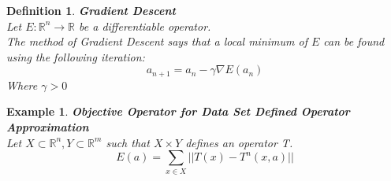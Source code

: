 \documentclass[12pt]{extarticle}
\theoremstyle{plain}
\theoremstyle{Definition}
\newtheorem{def.}{Definition}[section]
\theoremstyle{Definition}
\theoremstyle{plain}
\newtheorem{exmp}{Example}[section]
\begin{document}
\begin{def.} \textbf{Gradient Descent} \\ 
Let $E : \mathbb{R}^n \to \mathbb{R}$ be a differentiable operator. \\ 
The method of Gradient Descent says that a local minimum of $E$ can be found using the following iteration: \\ 
$$a_{n+1} = a_n - \gamma \nabla E(a_n)$$
Where $\gamma > 0$ \\ 
\end{def.}
\begin{exmp} \textbf{Objective Operator for Data Set Defined Operator Approximation} \\ 		
Let $X \subset \mathbb{R}^n, Y \subset \mathbb{R}^m$ such that $X\times Y$ defines an operator T. \\ 
$$E(a) = \sum_{x \in X} ||T(x) - T^n(x,a)||$$ 
\end{exmp}
\newpage
\end{document}
